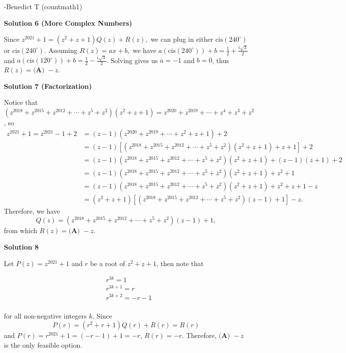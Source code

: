 \begin{enumerate}
 -Benedict T (countmath1)

 



\textbf{Solution 6 (More Complex Numbers)}

Since $z^{2021}+1=(z^2+z+1)Q(z)+R(z),$ we can plug in either $\text{cis} (240^{\circ})$ or $\text{cis} (240^{\circ})$. Assuming $R(z)=ax+b,$ we have $a(\text{cis}(240^{\circ}))+b=\frac{1}{2}+\frac{i\sqrt{3}}{2}$ and $a(\text{cis}(120^{\circ}))+b=\frac{1}{2}-\frac{i\sqrt{3}}{2}.$ Solving gives us $a=-1$ and $b=0$, thus $R(z)=\boxed{\textbf{(A) }{-}z}.$




\textbf{Solution 7 (Factorization)}

Notice that $(z^{2018} + z^{2015} + z^{2012} + \cdots + z^5 + z^2)(z^2 + z + 1) = z^{2020} + z^{2019} + \cdots + z^{4} + z^3 + z^2$, so 
 \begin{align*} z^{2021} + 1 = z^{2021} - 1 + 2 &= (z-1)( z^{2020} + z^{2019} + \cdots + z^{2} + z + 1 ) + 2 \\ &= (z-1)[(z^{2018} + z^{2015} + z^{2012} + \cdots + z^5 + z^2)(z^2 + z + 1) + z + 1] + 2 \\ &= (z-1)(z^{2018} + z^{2015} + z^{2012} + \cdots + z^5 + z^2)(z^2 + z + 1) + (z-1)(z+1) + 2 \\ &= (z-1)(z^{2018} + z^{2015} + z^{2012} + \cdots + z^5 + z^2)(z^2 + z + 1) + z^2 + 1 \\ &= (z-1)(z^{2018} + z^{2015} + z^{2012} + \cdots + z^5 + z^2)(z^2 + z + 1) + z^2 + z + 1 - z \\ &= (z^2 + z + 1)[(z^{2018} + z^{2015} + z^{2012} + \cdots + z^5 + z^2)(z-1) + 1] - z. \end{align*}
Therefore, we have 
 \[Q(z) = (z^{2018} + z^{2015} + z^{2012} + \cdots + z^5 + z^2)(z-1) + 1,\] from which $R(z) = \boxed{\textbf{(A) }{-}z}$.

 



\textbf{Solution 8}

Let $P(z)=z^{2021}+1$ and $r$ be a root of $z^2+z+1$, then note that

 
 \begin{align*} &r^{3k} = 1 \\ &r^{3k+1} = r \\ &r^{3k+2} = -r-1 \\ \end{align*}


 for all non-negative integers $k$. Since
 \[P(r)=(r^2+r+1)Q(r)+R(r)=R(r)\]and $P(r)=r^{2021}+1=(-r - 1)+1=-r$, $R(r)=-r$. Therefore, $\boxed{\textbf{(A) }{-}z}$ is the only feasible option.


\end{enumerate}
